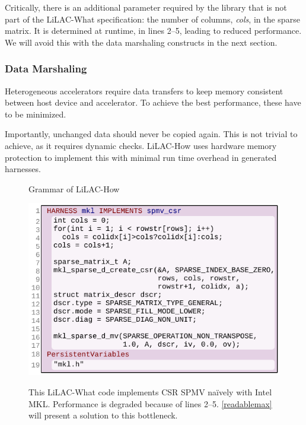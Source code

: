Critically, there is an additional parameter required by the library that is
not part of the LiLAC-What specification: the number of columns, {\em cols}, in
the sparse matrix.
It is determined at runtime, in lines 2--5, leading to reduced performance.
We will avoid this with the data marshaling constructs in the next section.

\subsubsection{Data Marshaling}
Heterogeneous accelerators require data transfers to keep memory consistent
between host device and accelerator.
To achieve the best performance, these have to be minimized.

Importantly, unchanged data should never be copied again.
This is not trivial to achieve, as it requires dynamic checks.
LiLAC-How uses hardware memory protection to implement this with minimal
run time overhead in generated harnesses.

\begin{figure}[t]
\centering

\vspace{-1.5em}
\caption{Grammar of LiLAC-How}
\label{lilacbnf2}
\end{figure}

\begin{figure}[t]
\includegraphics[width=0.944\linewidth]{figures/harness2.pdf}
\\[-0.75em]
\caption{This LiLAC-What code implements CSR SPMV na\"ively with Intel MKL.
         Performance is degraded because of lines 2--5.
         \autoref{readablemax} will present a solution to this bottleneck.}
\vspace{2.em}
\label{mklharness1}
\end{figure}

